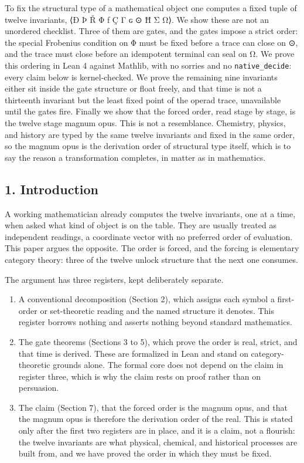 \documentclass[12pt,a4paper]{article}
\begin{document}
To fix the structural type of a mathematical object one computes a fixed
tuple of twelve invariants, ⟨Ð Þ Ř Φ ƒ Ç Γ ɢ ⊙ Ħ Σ Ω⟩. We show these are
not an unordered checklist. Three of them are gates, and the gates
impose a strict order: the special Frobenius condition on Φ must be
fixed before a trace can close on ⊙, and the trace must close before an
idempotent terminal can seal on Ω. We prove this ordering in Lean 4
against Mathlib, with no sorries and no \texttt{native\_decide}: every
claim below is kernel-checked. We prove the remaining nine invariants
either sit inside the gate structure or float freely, and that time is
not a thirteenth invariant but the least fixed point of the operad
trace, unavailable until the gates fire. Finally we show that the forced
order, read stage by stage, is the twelve stage magnum opus. This is not
a resemblance. Chemistry, physics, and history are typed by the same
twelve invariants and fixed in the same order, so the magnum opus is the
derivation order of structural type itself, which is to say the reason a
transformation completes, in matter as in mathematics.

\hypertarget{introduction}{%
\subsection{1. Introduction}\label{introduction}}

A working mathematician already computes the twelve invariants, one at a
time, when asked what kind of object is on the table. They are usually
treated as independent readings, a coordinate vector with no preferred
order of evaluation. This paper argues the opposite. The order is
forced, and the forcing is elementary category theory: three of the
twelve unlock structure that the next one consumes.

The argument has three registers, kept deliberately separate.

\begin{enumerate}
\def\labelenumi{\arabic{enumi}.}
\tightlist
\item
  A conventional decomposition (Section 2), which assigns each symbol a
  first-order or set-theoretic reading and the named structure it
  denotes. This register borrows nothing and asserts nothing beyond
  standard mathematics.
\item
  The gate theorems (Sections 3 to 5), which prove the order is real,
  strict, and that time is derived. These are formalized in Lean and
  stand on category-theoretic grounds alone. The formal core does not
  depend on the claim in register three, which is why the claim rests on
  proof rather than on persuasion.
\item
  The claim (Section 7), that the forced order is the magnum opus, and
  that the magnum opus is therefore the derivation order of the real.
  This is stated only after the first two registers are in place, and it
  is a claim, not a flourish: the twelve invariants are what physical,
  chemical, and historical processes are built from, and we have proved
  the order in which they must be fixed.
\end{enumerate}
\end{document}
